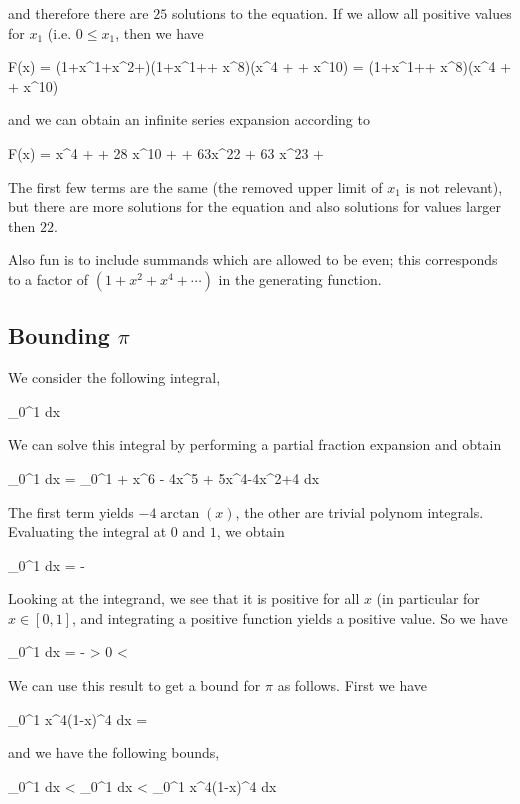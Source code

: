 and therefore there are $25$ solutions to the equation. If we allow all positive values for $x_1$ (i.e. $0 \leq x_1$, then we have

\bee
F(x) = (1+x^1+x^2+\cdots)(1+x^1+\cdots + x^8)(x^4 + \cdots + x^{10}) = (1+x^1+\cdots + x^8)(x^4 + \cdots + x^{10})
\eee

and we can obtain an infinite series expansion according to

\bee
F(x) = x^4 + \cdots + 28 x^{10} + \cdots + 63x^{22} + 63 x^{23} + \cdots
\eee

The first few terms are the same (the removed upper limit of $x_1$ is not relevant), but there are more solutions for the equation and also solutions for values larger then $22$.

Also fun is to include summands which are allowed to be even; this corresponds to a factor of $(1+x^2+x^4 + \cdots)$ in the generating function.


\subsection{Bounding $\pi$}

We consider the following integral,

\bee
\int_0^1  dx
\eee

We can solve this integral by performing a partial fraction expansion and obtain

\bee
\int_0^1  dx = \int_0^1  + x^6 - 4x^5 + 5x^4-4x^2+4 dx
\eee

The first term yields $-4 \arctan(x)$, the other are trivial polynom integrals. Evaluating the integral at $0$ and $1$, we obtain

\bee
\int_0^1  dx =  - \pi
\eee

Looking at the integrand, we see that it is positive for all $x$ (in particular for $x \in [0,1]$, and integrating a positive function yields a positive value. So we have

\bee
\int_0^1  dx =  - \pi > 0 \rightarrow \pi < 
\eee

We can use this result to get a bound for $\pi$ as follows. First we have

\bee
\int_0^1 x^4(1-x)^4 dx = 
\eee

and we have the following bounds,

\bee
\int_0^1  dx < \int_0^1  dx < \int_0^1 x^4(1-x)^4 dx
\eee

